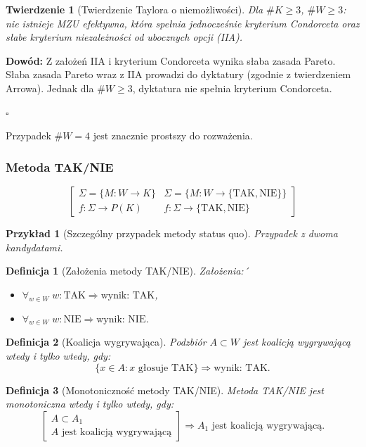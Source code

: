 \documentclass[12pt,a4paper]{article}
\newcounter{twierdzenie}
\theoremstyle{break}
\newtheorem{definition}{Definicja}[section]
\newtheorem{theorem}{Twierdzenie}[section]
\newtheorem{example}{Przykład}[section]
\begin{document}
\begin{theorem}[Twierdzenie Taylora o niemożliwości]
	Dla $\# K \geq 3$, $\# W \geq 3$:  
	nie istnieje MZU efektywna, która spełnia jednocześnie kryterium Condorceta oraz słabe kryterium niezależności od ubocznych opcji (IIA).
\end{theorem}

\noindent \textbf{Dowód:}  
Z założeń IIA i kryterium Condorceta wynika słaba zasada Pareto.  
Słaba zasada Pareto wraz z IIA prowadzi do dyktatury (zgodnie z twierdzeniem Arrowa).  
Jednak dla $\# W \geq 3$, dyktatura nie spełnia kryterium Condorceta.  
\begin{flushright}$\square$\end{flushright}

Przypadek $\# W = 4$ jest znacznie prostszy do rozważenia.

\subsubsection{Metoda TAK/NIE}
$$
\begin{bmatrix}
	\Sigma = \{ M: W \rightarrow K \} & \Sigma = \{ M: W \rightarrow \{ \text{TAK}, \text{NIE} \} \} \\
	f:\Sigma \rightarrow P(K) & f:\Sigma \rightarrow \{ \text{TAK}, \text{NIE} \}
\end{bmatrix}
$$

\begin{example}[Szczególny przypadek metody status quo]
	Przypadek z dwoma kandydatami.
\end{example}
\begin{definition}[Założenia metody TAK/NIE]
	 Założenia:´
	
	\begin{itemize}
		\item $\forall_{w \in W} \; w : \text{TAK} \Rightarrow \text{wynik: TAK}$,
		\item $\forall_{w \in W} \; w : \text{NIE} \Rightarrow \text{wynik: NIE}$.
	\end{itemize}
\end{definition}



\begin{definition}[Koalicja wygrywająca]
	Podzbiór $A \subset W$ jest koalicją wygrywającą wtedy i tylko wtedy, gdy:  
	$$\{x \in A : x \text{ głosuje TAK} \} \Rightarrow \text{wynik: TAK.}$$
\end{definition}

\begin{definition}[Monotoniczność metody TAK/NIE]
	Metoda TAK/NIE jest monotoniczna wtedy i tylko wtedy, gdy:  
	$$
	\begin{bmatrix}
		A \subset A_1 \\
		A \text{ jest koalicją wygrywającą}
	\end{bmatrix}
	\Rightarrow A_1 \text{ jest koalicją wygrywającą.}
	$$
\end{definition}
\end{document}
